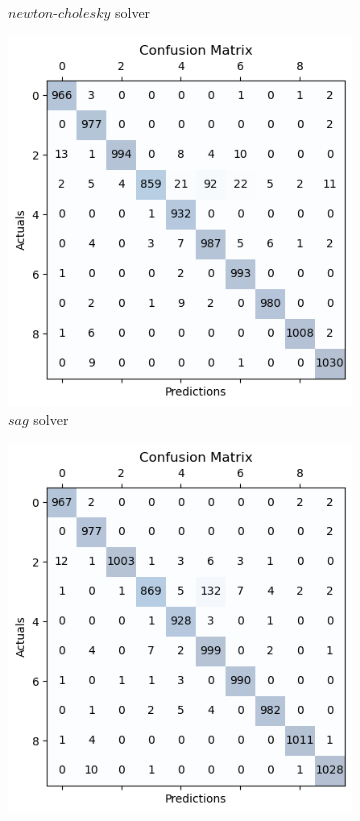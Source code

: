 \documentclass{article}
\begin{document}
\begin{titlepage}
\begin{figure}[htbp]
\begin{subfigure}[t]{0.3\linewidth}
      \caption{$newton$-$cholesky$ solver}
      \label{fig:sample6d}
    \end{subfigure}
    \hfill
    \begin{subfigure}[t]{0.3\linewidth}
      \includegraphics[width=\linewidth]{LRMC(sag).png}
      \caption{$sag$ solver}
      \label{fig:sample6f}
    \end{subfigure}
    \hfill
    \begin{subfigure}[t]{0.3\linewidth}
      \includegraphics[width=\linewidth]{LRMC(saga).png}

\end{subfigure}
\end{figure}
\end{titlepage}
\end{document}
